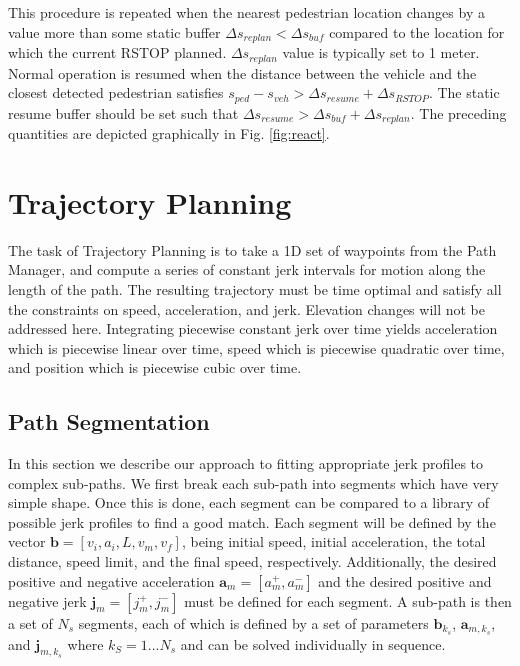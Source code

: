 \documentclass[letterpaper, 10 pt, conference]{ieeeconf}  %
\begin{document}
This procedure is repeated when the nearest pedestrian location changes by a value more than some static buffer $\Delta s_{replan} < \Delta s_{buf}$ compared to the location for which the current RSTOP planned.
$\Delta s_{replan}$ value is typically set to 1 meter.
Normal operation is resumed when the distance between the vehicle and the closest detected pedestrian satisfies $s_{ped} - s_{veh} > \Delta s_{resume} + \Delta s_{RSTOP}$. The static resume buffer should be set such that $\Delta s_{resume} > \Delta s_{buf} + \Delta s_{replan}$.
The preceding quantities are depicted graphically in Fig. \ref{fig:react}.


\section{Trajectory Planning} \label{sec:trajectoryplanning}

The task of Trajectory Planning is to take a 1D set of waypoints from the Path Manager, and compute a series of constant jerk intervals for motion along the length of the path.
The resulting trajectory must be time optimal and satisfy all the constraints on speed, acceleration, and jerk.
Elevation changes will not be addressed here.
Integrating piecewise constant jerk over time yields acceleration which is piecewise linear over time, speed which is piecewise quadratic over time, and position which is piecewise cubic over time.


\subsection{Path Segmentation} \label{sec:pathsegmentation}

In this section we describe our approach to fitting appropriate jerk profiles to complex sub-paths. 
We first break each sub-path into segments which have very simple shape.
Once this is done, each segment can be compared to a library of possible jerk profiles to find a good match.
Each segment will be defined by the vector $\mathbf{b}  = [v_i, a_i, L, v_m, v_f]$, being initial speed, initial acceleration, the total distance, speed limit, and the final speed, respectively.
Additionally, the desired positive and negative acceleration $\mathbf{a}_m = [a^+_m , a^-_m]$ and the desired positive and negative jerk $\mathbf{j}_m = [j^+_m , j^-_m]$ must be defined for each segment.
A sub-path is then a set of $N_s$ segments, each of which is defined by a set of parameters $\mathbf{b}_{k_s}$, $\mathbf{a}_{m,k_s}$, and $\mathbf{j}_{m,k_s}$ where $k_S = 1 ... N_s$ and can be solved individually in sequence.
\end{document}
